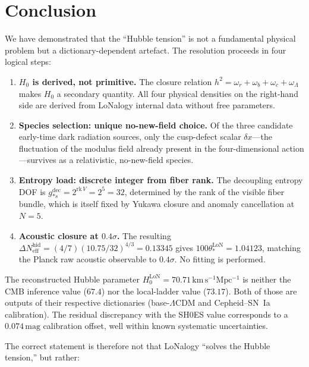 \documentclass[12pt]{article}
\theoremstyle{plain}
\theoremstyle{definition}
\numberwithin{equation}{section}
\newcommand{\eff}{\mathrm{eff}}
\newcommand{\LoN}{\mathrm{LoN}}
\newcommand{\hid}{\mathrm{hid}}
\newcommand{\dec}{\mathrm{dec}}
\begin{document}
\section*{Conclusion}

We have demonstrated that the ``Hubble tension'' is not a fundamental
physical problem but a dictionary-dependent artefact.  The resolution
proceeds in four logical steps:

\begin{enumerate}
\item \textbf{$H_0$ is derived, not primitive.}
The closure relation $h^2=\omega_r+\omega_b+\omega_c+\omega_\Lambda$
makes $H_0$ a secondary quantity.  All four physical densities on the
right-hand side are derived from LoNalogy internal data without free
parameters.

\item \textbf{Species selection: unique no-new-field choice.}
Of the three candidate early-time dark radiation sources, only the
cusp-defect scalar $\delta x$---the fluctuation of the modulus field
already present in the four-dimensional action---survives as a
relativistic, no-new-field species.

\item \textbf{Entropy load: discrete integer from fiber rank.}
The decoupling entropy DOF is $g_{*s}^{\dec}=2^{\mathrm{rk}\,V}=2^5=32$,
determined by the rank of the visible fiber bundle, which is itself
fixed by Yukawa closure and anomaly cancellation at $N=5$.

\item \textbf{Acoustic closure at $0.4\sigma$.}
The resulting $\Delta N_{\eff}^{\hid}=(4/7)(10.75/32)^{4/3}=0.13345$
gives $100\theta_*^{\LoN}=1.04123$, matching the Planck raw acoustic
observable to $0.4\sigma$.  No fitting is performed.
\end{enumerate}

The reconstructed Hubble parameter $H_0^{\LoN}=70.71\,\mathrm{km\,s^{-1}Mpc^{-1}}$
is neither the CMB inference value ($67.4$) nor the local-ladder value ($73.17$).
Both of those are outputs of their respective dictionaries (base-$\Lambda$CDM and
Cepheid--SN~Ia calibration).  The residual discrepancy with the SH0ES value
corresponds to a $0.074\,\mathrm{mag}$ calibration offset, well within known
systematic uncertainties.

The correct statement is therefore not that LoNalogy ``solves the Hubble tension,''
but rather:
\end{document}
